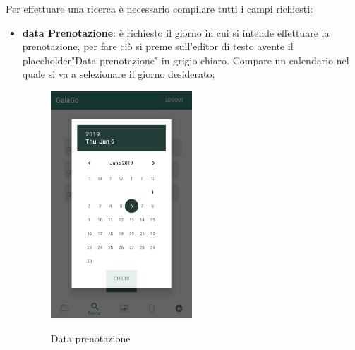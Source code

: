 Per effettuare una ricerca è necessario compilare tutti i campi richiesti:
\begin{itemize}
	\item \textbf{data Prenotazione}: è richiesto il giorno in cui si intende effettuare la prenotazione, per fare ciò si preme sull'editor di testo avente il placeholder\glosp "Data prenotazione" in grigio chiaro. Compare un calendario nel quale si va a selezionare il giorno desiderato;
	 \begin{figure}[H] 
	 	\centering 
	 	\includegraphics[width=0.5\textwidth]{res/images/data_prenotazione.png}\\
	 	\caption{Data prenotazione}
	 	\label{data}
	 \end{figure}
 \pagebreak
 

\end{itemize}
